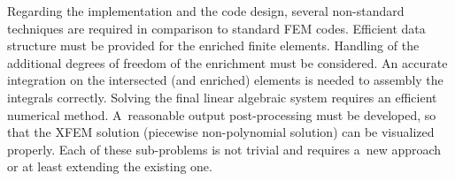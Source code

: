 
Regarding the implementation and the code design, several non-standard techniques are required
in comparison to standard FEM codes.
Efficient data structure must be provided for the enriched finite elements.
Handling of the additional degrees of freedom of the enrichment must be considered.
An accurate integration on the intersected (and enriched) elements is needed to assembly the integrals correctly. 
Solving the final linear algebraic system requires an efficient numerical method.
A~reasonable output post-processing must be developed, so that the XFEM solution (piecewise non-polynomial solution)
can be visualized properly.
Each of these sub-problems is not trivial and requires a~new approach or at least extending the existing one.


% 
% 

